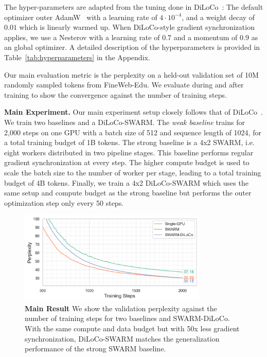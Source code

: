 \documentclass{article}
\begin{document}
The hyper-parameters are adapted from the tuning done in
DiLoCo~\cite{douillard2023diloco}: The default optimizer outer
AdamW~\cite{loshchilov2019adamw} with a learning rate of $4\cdot 10^{-4}$, and a
weight decay of $0.01$ which is linearly warmed up. When DiLoCo-style gradient
synchronization applies, we use a Nesterov with a learning rate of $0.7$ and a
momentum of $0.9$ as an global optimizer. A detailed description of the
hyperparameters is provided in Table~\ref{tab:hyperparameters} in the Appendix.

Our main evaluation metric is the perplexity on a held-out validation set of 10M
randomly sampled tokens from FineWeb-Edu. We evaluate during and after training
to show the convergence against the number of training steps.

\textbf{Main Experiment.} Our main experiment setup closely follows that of
DiLoCo~\cite{douillard2023diloco}. We train two baselines and a DiLoCo-SWARM. The
\textit{weak baseline} trains for 2,000 steps on one GPU with a batch size of
512 and sequence length of 1024, for a total training budget of 1B tokens. The 
strong baseline is a 4x2 SWARM, i.e. eight workers distributed in two pipeline 
stages. This baseline performs regular gradient synchronization at every step.
The higher compute budget is used to scale the batch size to the number of
worker per stage, leading to a total training budget of 4B tokens. Finally, we
train a 4x2 DiLoCo-SWARM which uses the same setup and compute budget as the
strong baseline but performs the outer optimization step only every 50 steps.

\begin{figure}[t]
  \centering
  \includegraphics[width=0.8\textwidth]{figures/experiment1.png}
  \caption{\textbf{Main Result} We show the validation perplexity against the
  number of training steps for two baselines and SWARM-DiLoCo. With the same
  compute and data budget but with 50x less gradient synchronization,
  DiLoCo-SWARM matches the generalization performance of the strong SWARM
  baseline.}
  \label{fig:experiment1}
\end{figure}
\end{document}
